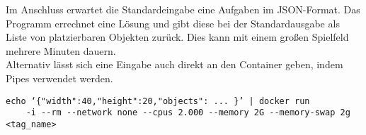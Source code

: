 Im Anschluss erwartet die Standardeingabe eine Aufgaben im JSON-Format. Das Programm errechnet eine Lösung und gibt diese bei der Standardausgabe als Liste von platzierbaren Objekten zurück. Dies kann mit einem großen Spielfeld mehrere Minuten dauern.
\\
Alternativ lässt sich eine Eingabe auch direkt an den Container geben, indem Pipes verwendet werden.
\begin{verbatim}echo ‘{"width":40,"height":20,"objects": ... }’ | docker run 
	-i --rm --network none --cpus 2.000 --memory 2G --memory-swap 2g <tag_name>\end{verbatim}




